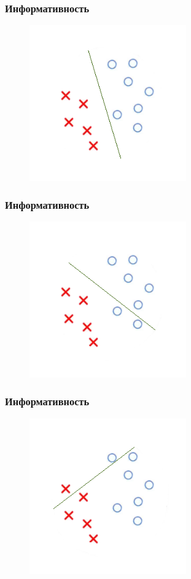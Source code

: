 \documentclass[12pt]{beamer}
\begin{document}
\begin{frame}\frametitle{Информативность}
\begin{figure}[htbp]
  \includegraphics[height=190pt, keepaspectratio = true]{images/dtree_2}   
\end{figure}
\end{frame}

\begin{frame}\frametitle{Информативность}
\begin{figure}[htbp]
  \includegraphics[height=190pt, keepaspectratio = true]{images/dtree_3}   
\end{figure}
\end{frame}

\begin{frame}\frametitle{Информативность}
\begin{figure}[htbp]
  \includegraphics[height=190pt, keepaspectratio = true]{images/dtree_4}   
\end{figure}
\end{frame}
\end{document}
